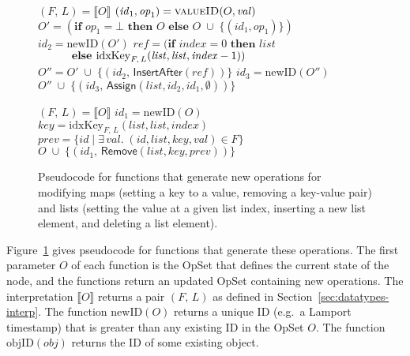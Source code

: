 \begin{figure}
\begin{minipage}[t]{0.5\textwidth}
\begin{algorithmic}
    \State $(F,\, L) = \llbracket O \rrbracket$
    \State $(\mathit{id}_1, \mathit{op}_1) = \Call{valueID}{O, \mathit{val}}$
    \State $O' = (\textbf{if } \mathit{op}_1 = \bot \textbf{ then } O \textbf{ else } 
        O \;\cup\; \big\{ (\mathit{id}_1, \mathit{op}_1) \big\})$
    \State $\mathit{id}_2 = \mathrm{newID}(O')$
    \State $\mathit{ref} = (\textbf{if } \mathit{index}=0 \textbf{ then } \mathit{list}$
    \State $\hphantom{\mathit{ref} = (}\textbf{else } \mathrm{idxKey}_{F,\, L}(\mathit{list}, \mathit{list}, \mathit{index} - 1))$
    \State $O'' = O' \;\cup\; \big\{ (\mathit{id}_2,\, \mathsf{InsertAfter}(\mathit{ref})) \big\}$
    \State $\mathit{id}_3 = \mathrm{newID}(O'')$
    \State \Return $O'' \;\cup\; \big\{ (\mathit{id}_3,\, \mathsf{Assign}(\mathit{list}, \mathit{id}_2, \mathit{id}_1, \emptyset)) \big\}$
    \EndFunction\Statex

    \State $(F,\, L) = \llbracket O \rrbracket$
    \State $\mathit{id}_1 = \mathrm{newID}(O)$
    \State $\mathit{key} = \mathrm{idxKey}_{F,\, L}(\mathit{list}, \mathit{list}, \mathit{index})$
    \State $\mathit{prev} = \{ \mathit{id} \mid \exists\,\mathit{val}.\; (\mathit{id}, \mathit{list}, \mathit{key}, \mathit{val}) \in F \}$
    \State \Return $O \;\cup\; \big\{ (\mathit{id}_1,\, \mathsf{Remove}(\mathit{list}, \mathit{key}, \mathit{prev})) \big\}$
    \EndFunction
\end{algorithmic}
\end{minipage}
\caption{Pseudocode for functions that generate new operations for modifying maps (setting a key to a value,
removing a key-value pair) and lists (setting the value at a given list index, inserting a new list element,
and deleting a list element).}\label{fig:pseudocode}
\end{figure}

\noindent
Figure~\ref{fig:pseudocode} gives pseudocode for functions that generate these operations.
The first parameter $O$ of each function is the OpSet that defines the current state of the node, and the functions return an updated OpSet containing new operations.
The interpretation $\llbracket O \rrbracket$ returns a pair $(F,\, L)$ as defined in Section~\ref{sec:datatypes-interp}.
The function $\mathrm{newID}(O)$ returns a unique ID (e.g.\ a Lamport timestamp) that is greater than any existing ID in the OpSet $O$.
The function $\mathrm{objID}(\mathit{obj})$ returns the ID of some existing object.

